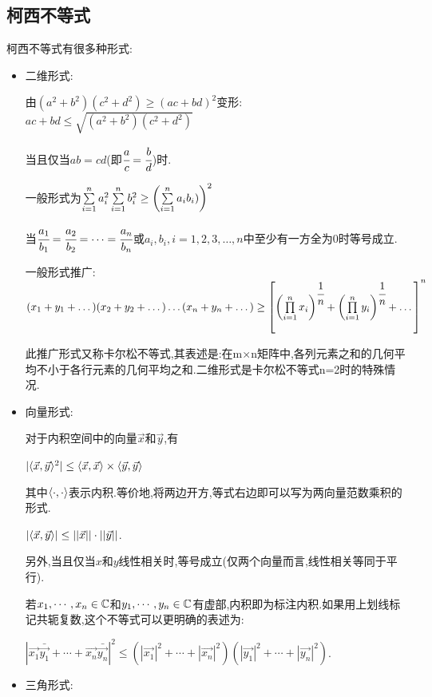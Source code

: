 {{\subsection{柯西不等式}{
    柯西不等式有很多种形式:
    \begin{itemize}
        \item {
              二维形式:

              由$(a^2 + b^2)(c^2 + d^2)\geq(ac + bd)^2$变形:$ac + bd \leq \sqrt{(a^2 + b^2)(c^2 + d^2)}$

              当且仅当$ab = cd$(即$\cfrac{a}{c} = \cfrac{b}{d}$)时.

              一般形式为$\upDownSum{n}{i = 1}a_i^2\upDownSum{n}{i = 1}b_i^2\geq\bigCase{\upDownSum{n}{i = 1}a_ib_i)}^2$

              当$\cfrac{a_1}{b_1} = \cfrac{a_2}{b_2} = \dots = \cfrac{a_n}{b_n}$或$a_i,b_i,i = 1,2,3,\dots,n$中至少有一方全为$0$时等号成立.

              一般形式推广:$(x_1 + y_1 + \dots)(x_2 + y_2 + \dots)\dots(x_n + y_n + \dots) \geq \left[\bigCase{\upDownProd{n}{i = 1}x_i}^{\cfrac{1}{n}} + \bigCase{\upDownProd{n}{i = 1}y_i}^{\cfrac{1}{n}} + \dots\right]^n$

              此推广形式又称卡尔松不等式,其表述是:在m×n矩阵中,各列元素之和的几何平均不小于各行元素的几何平均之和.二维形式是卡尔松不等式n=2时的特殊情况.
              }
        \item {
              向量形式:

              对于内积空间中的向量$\vec{x}$和$\vec{y}$,有

              $|\innerProduct{\vec{x}}{\vec{y}}^2| \leq \innerProduct{\vec{x}}{\vec{x}} \times \innerProduct{\vec{y}}{\vec{y}}$

              其中$\innerProduct{\cdot}{\cdot}$表示内积.等价地,将两边开方,等式右边即可以写为两向量范数乘积的形式.

              $|\innerProduct{\vec{x}}{\vec{y}}| \leq ||\vec{x}||\cdot||\vec{y}||$.

              另外,当且仅当$x$和$y$线性相关时,等号成立(仅两个向量而言,线性相关等同于平行).

              若$x_1,\dotsm,x_n \in \mathConstant$和$y_1,\dotsm,y_n \in \mathConstant$有虚部,内积即为标注内积.如果用上划线标记共轭复数,这个不等式可以更明确的表述为:

              $|\vec{x_1}\bar{\vec{y_1}} + \dotsm + \vec{x_n}\bar{\vec{y_n}}|^2\leq (|\vec{x_1}|^2 + \dotsm + |\vec{x_n}|^2)(|\vec{y_1}|^2 + \dotsm + |\vec{y_n}|^2)$.
              }
        \item {
              三角形式:

}
\end{itemize}}}}
